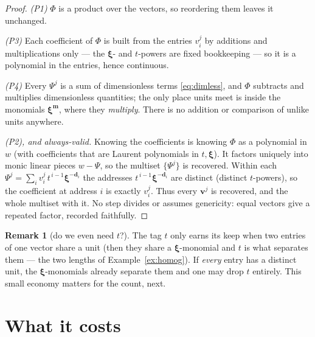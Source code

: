 \documentclass[11pt,a4paper]{article}
\theoremstyle{definition}
\newtheorem{remark}[definition]{Remark}
\theoremstyle{plain}
\newcommand{\bvec}[1]{\mathbf{#1}}
\begin{document}
\begin{proof}
\emph{(P1)} $\Phi$ is a product over the vectors, so reordering them leaves it
unchanged.

\emph{(P3)} Each coefficient of $\Phi$ is built from the entries $v^j_i$ by
additions and multiplications only --- the $\boldsymbol\xi$- and $t$-powers are
fixed bookkeeping --- so it is a polynomial in the entries, hence continuous.

\emph{(P4)} Every $\Psi^j$ is a sum of dimensionless terms \eqref{eq:dimless}, and
$\Phi$ subtracts and multiplies dimensionless quantities; the only place units meet
is inside the monomials $\boldsymbol\xi^{\bvec m}$, where they \emph{multiply}.
There is no addition or comparison of unlike units anywhere.

\emph{(P2), and always-valid.} Knowing the coefficients is knowing $\Phi$ as a
polynomial in $w$ (with coefficients that are Laurent polynomials in
$t,\boldsymbol\xi$). It factors uniquely into monic linear pieces $w-\Psi$, so the
multiset $\{\Psi^j\}$ is recovered. Within each $\Psi^j=\sum_i v^j_i\,
t^{\,i-1}\boldsymbol\xi^{-\bvec d_i}$ the addresses $t^{\,i-1}\boldsymbol\xi^{-\bvec
d_i}$ are distinct (distinct $t$-powers), so the coefficient at address $i$ is
exactly $v^j_i$. Thus every $\bvec v^j$ is recovered, and the whole multiset with
it. No step divides or assumes genericity: equal vectors give a repeated factor,
recorded faithfully.
\end{proof}

\begin{remark}[do we even need $t$?]\label{rmk:needt}
The tag $t$ only earns its keep when two entries of one vector share a unit (then
they share a $\boldsymbol\xi$-monomial and $t$ is what separates them --- the two
lengths of Example~\ref{ex:homog}). If \emph{every} entry has a distinct unit, the
$\boldsymbol\xi$-monomials already separate them and one may drop $t$ entirely.
This small economy matters for the count, next.
\end{remark}

\section{What it costs}
\label{sec:cost}
\end{document}
